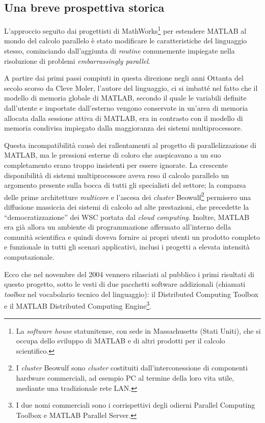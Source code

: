 \nocite{Sharma2009}
\subsection{Una breve prospettiva storica}
L'approccio seguito dai progettisti di MathWorks\textsuperscript{\textregistered}\footnote{La \textit{software house} statunitense, con sede in Massachusetts (Stati Uniti), che si occupa dello sviluppo di MATLAB e di altri prodotti per il calcolo scientifico.}
per estendere MATLAB al mondo del calcolo parallelo \`e stato modificare le caratteristiche del linguaggio 
stesso, cominciando dall'aggiunta di \textit{routine} comunemente impiegate nella risoluzione di problemi \textit{embarrassingly parallel}. 

A partire dai primi passi compiuti in questa direzione negli anni Ottanta del secolo scorso da Cleve Moler, l'autore del linguaggio, ci si imbatt\'e
nel fatto che il modello di memoria globale di MATLAB, secondo il quale le variabili definite dall'utente e importate dall'esterno vengono conservate 
in un'area di memoria allocata dalla sessione attiva di MATLAB, era in contrasto con il modello di memoria condivisa impiegato dalla maggioranza dei sistemi 
multiprocessore.

Questa incompatibilit\`a causò dei rallentamenti al progetto di parallelizzazione di MATLAB, ma le pressioni esterne di coloro che auspicavano a un suo completamento erano troppo insistenti per essere ignorate.\newline
La crescente disponibilit\`a di sistemi multiprocessore aveva reso il calcolo parallelo un argomento presente sulla bocca di tutti gli specialisti del 
settore; la comparsa delle prime architetture \textit{multicore} e l'ascesa dei \textit{cluster} Beowulf\footnote{I \textit{cluster} Beowulf sono \textit{cluster} costituiti dall'interconessione di componenti hardware commerciali, ad esempio PC al termine della loro vita utile, mediante una tradizionale rete LAN. } permisero una diffusione massiccia dei sistemi di calcolo ad alte prestazioni, che precedette la \enquote{democratizzazione} dei WSC portata dal \textit{cloud computing}.\newline   
Inoltre, MATLAB era gi\`a allora un ambiente di programmazione affermato all'interno della comunit\`a scientifica e quindi doveva fornire ai propri utenti un prodotto completo e funzionale 
in tutti gli scenari applicativi, inclusi i progetti a elevata intensit\`a computazionale.

Ecco che nel novembre del 2004 vennero rilasciati al pubblico i primi risultati di questo progetto, sotto le vesti di due pacchetti software addizionali (chiamati \textit{toolbox} nel vocabolario tecnico del linguaggio): il Distributed Computing 
Toolbox\textsuperscript{\texttrademark} e il MATLAB Distributed Computing Engine\textsuperscript{\texttrademark}\footnote{I due nomi commerciali sono i corrispettivi degli odierni Parallel 
Computing Toolbox\textsuperscript{\texttrademark} e MATLAB Parallel Server\textsuperscript{\texttrademark}.}.

